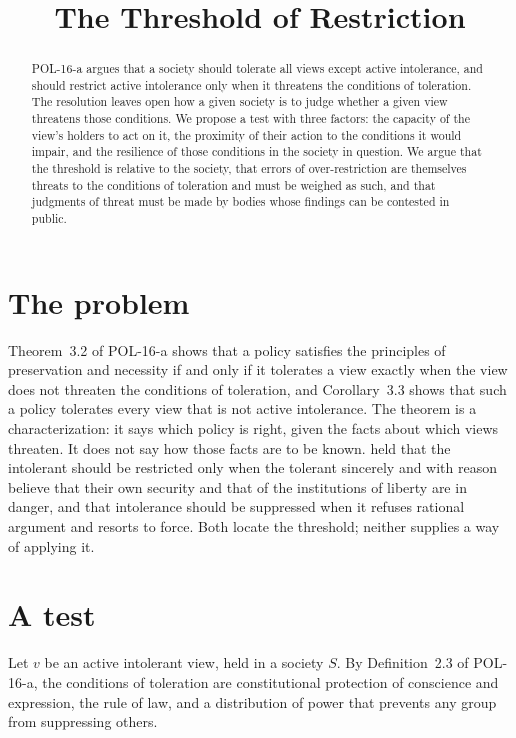 \documentclass{situationist-preprint}
\title{The Threshold of Restriction}
\begin{document}
\maketitle

\begin{abstract}
POL-16-a argues that a society should tolerate all views except active intolerance, and should restrict active intolerance only when it threatens the conditions of toleration. The resolution leaves open how a given society is to judge whether a given view threatens those conditions. We propose a test with three factors: the capacity of the view's holders to act on it, the proximity of their action to the conditions it would impair, and the resilience of those conditions in the society in question. We argue that the threshold is relative to the society, that errors of over-restriction are themselves threats to the conditions of toleration and must be weighed as such, and that judgments of threat must be made by bodies whose findings can be contested in public.
\end{abstract}

\section{The problem}

Theorem~3.2 of POL-16-a shows that a policy satisfies the principles of preservation and necessity if and only if it tolerates a view exactly when the view does not threaten the conditions of toleration, and Corollary~3.3 shows that such a policy tolerates every view that is not active intolerance. The theorem is a characterization: it says which policy is right, given the facts about which views threaten. It does not say how those facts are to be known. \citet[\S35]{Rawls1971} held that the intolerant should be restricted only when the tolerant sincerely and with reason believe that their own security and that of the institutions of liberty are in danger, and \citet[ch.~7, n.~4]{Popper1945} that intolerance should be suppressed when it refuses rational argument and resorts to force. Both locate the threshold; neither supplies a way of applying it.

\section{A test}

Let $v$ be an active intolerant view, held in a society $S$. By Definition~2.3 of POL-16-a, the conditions of toleration are constitutional protection of conscience and expression, the rule of law, and a distribution of power that prevents any group from suppressing others.
\end{document}
